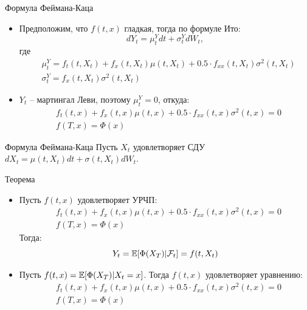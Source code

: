 \documentclass{beamer}
\begin{document}
\begin{frame}{Формула Феймана-Каца}
    \begin{itemize}
        \item Предположим, что $f(t, x)$ гладкая, тогда по формуле Ито:
        $$
            dY_t = \mu^Y_t dt + \sigma^Y_t dW_t,
        $$где \noident
        \begin{align*}
            &\mu^Y_t = f_t(t, X_t) + f_x(t, X_t) \mu(t, X_t) + 0.5 \cdot f_{xx}(t, X_t) \sigma^2(t,X_t) \\
            &\sigma_t^Y = f_x(t, X_t) \sigma^2(t, X_t) 
        \end{align*}
        \item $Y_t$ -- мартингал Леви, поэтому $\mu^Y_t = 0$, откуда:\noident
        \begin{align*}
            &f_t(t, x) + f_x(t, x) \mu(t, x) + 0.5 \cdot f_{xx}(t, x) \sigma^2(t, x) = 0 \\
            &f(T, x) = \Phi(x)
        \end{align*}
    \end{itemize}
\end{frame}

\begin{frame}{Формула Феймана-Каца}
    Пусть $X_t$ удовлетворяет СДУ $dX_t = \mu(t, X_t) dt + \sigma(t, X_t) dW_t$. 
    \begin{block}{Теорема}
    \begin{itemize}
        \item Пусть $f(t, x)$ удовлетворяет УРЧП:
        \begin{align*}
            &f_t(t, x) + f_x(t, x) \mu(t, x) + 0.5 \cdot f_{xx}(t, x) \sigma^2(t, x) = 0 \\
            &f(T, x) = \Phi(x)
        \end{align*} Тогда:
        $$
            Y_t = \mathbb{E}[\Phi(X_T) | \mathcal{F}_t] = f(t, X_t)
        $$

        \item Пусть $f(t, x) = \mathbb{E}[\Phi(X_T) | X_t = x]$. Тогда $f(t, x)$ удовлетворяет уравнению:
        \begin{align*}
            &f_t(t, x) + f_x(t, x) \mu(t, x) + 0.5 \cdot f_{xx}(t, x) \sigma^2(t, x) = 0 \\
            &f(T, x) = \Phi(x)
        \end{align*}

    \end{itemize}

    \end{block}
\end{frame}
\end{document}
